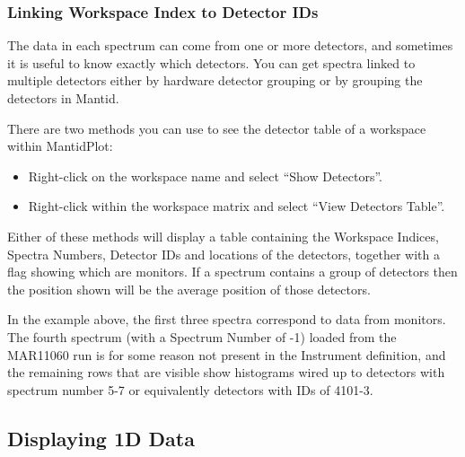 \documentclass[letterpaper,10pt,english,openany]{sphinxmanual}
\begin{document}
\subsubsection{Linking Workspace Index to Detector IDs}
\label{\detokenize{mantid_basic_course/loading_and_displaying_data/02_the_matrix_workspace:linking-workspace-index-to-detector-ids}}
The data in each spectrum can come from one or more detectors, and
sometimes it is useful to know exactly which detectors. You can get
spectra linked to multiple detectors either by hardware detector
grouping or by grouping the detectors in Mantid.

There are two methods you can use to see the detector table of a
workspace within MantidPlot:
\begin{itemize}
\item {} 
Right-click on the workspace name and select “Show Detectors”.

\item {} 
Right-click within the workspace matrix and select “View Detectors
Table”.

\end{itemize}

Either of these methods will display a table containing the Workspace
Indices, Spectra Numbers, Detector IDs and locations of the detectors,
together with a flag showing which are monitors. If a spectrum contains
a group of detectors then the position shown will be the average
position of those detectors.

\begin{figure}[H]
\centering

\noindent{}
\end{figure}

In the example above, the first three spectra correspond to data from
monitors. The fourth spectrum (with a Spectrum Number of -1) loaded from
the MAR11060 run is for some reason not present in the Instrument
definition, and the remaining rows that are visible show histograms
wired up to detectors with spectrum number 5-7 or equivalently detectors
with IDs of 4101-3.




\subsection{Displaying 1D Data}
\label{\detokenize{mantid_basic_course/loading_and_displaying_data/03_displaying_1D_data:displaying-1d-data}}\label{\detokenize{mantid_basic_course/loading_and_displaying_data/03_displaying_1D_data:id1}}\label{\detokenize{mantid_basic_course/loading_and_displaying_data/03_displaying_1D_data::doc}}
\end{document}
